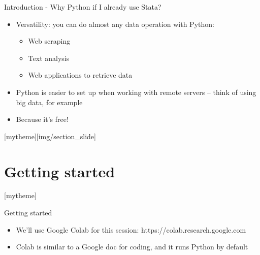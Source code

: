 \documentclass[aspectratio=169]{beamer}
\newcommand{\sectionpic}[2]{
	\setbeamertemplate{section page}[mytheme][#2]
	\section{#1}
	\setbeamertemplate{section page}[mytheme]
}
\begin{document}
\begin{frame}{Introduction - Why Python if I already use Stata?}

	\begin{itemize}
		\item Versatility: you can do almost any data operation with Python:
		\begin{itemize}
			\item Web scraping
			\item Text analysis
			\item Web applications to retrieve data
		\end{itemize}
		\item Python is easier to set up when working with remote servers -- think of using big data, for example
		\item Because it's free!
	\end{itemize}

\end{frame}

\sectionpic{Getting started}{img/section_slide}

\begin{frame}{Getting started}

	\begin{itemize}
		\item We'll use Google Colab for this session: https://colab.research.google.com
		\item Colab is similar to a Google doc for coding, and it runs Python by default
	\end{itemize}

\end{frame}
\end{document}

